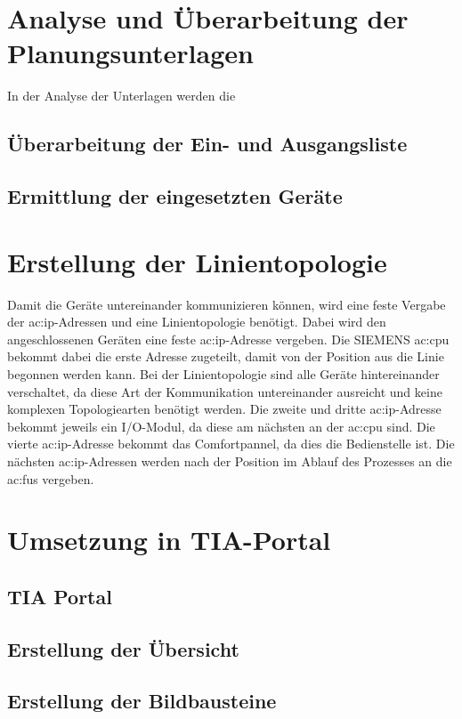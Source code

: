 \chapter{Analyse und Überarbeitung der Planungsunterlagen}

In der Analyse der Unterlagen werden die 

\section{Überarbeitung der Ein- und Ausgangsliste}

\section{Ermittlung der eingesetzten Geräte}

\chapter{Erstellung der Linientopologie}

Damit die Geräte untereinander kommunizieren können, wird eine feste Vergabe der \gls{ac:ip}-Adressen und eine Linientopologie benötigt. Dabei wird den angeschlossenen Geräten eine feste \gls{ac:ip}-Adresse vergeben. Die SIEMENS \gls{ac:cpu} bekommt dabei die erste Adresse zugeteilt, damit von der Position aus die Linie begonnen werden kann. Bei der Linientopologie sind alle Geräte hintereinander verschaltet, da diese Art der Kommunikation untereinander ausreicht und keine komplexen Topologiearten benötigt werden. Die zweite und dritte \gls{ac:ip}-Adresse bekommt jeweils ein I/O-Modul, da diese am nächsten an der \gls{ac:cpu} sind. Die vierte \gls{ac:ip}-Adresse bekommt das Comfortpannel, da dies die Bedienstelle ist. Die nächsten \gls{ac:ip}-Adressen werden nach der Position im Ablauf des Prozesses an die \gls{ac:fu}s vergeben. 

\chapter{Umsetzung in TIA-Portal}

\section{TIA Portal}
\section{Erstellung der Übersicht}
\section{Erstellung der Bildbausteine}
